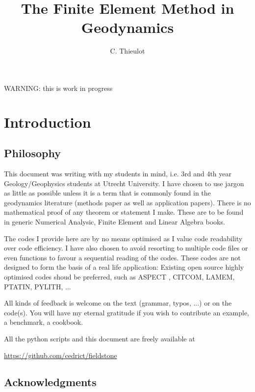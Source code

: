 \documentclass[a4paper]{article}
\title{The Finite Element Method in Geodynamics}
\author{C. Thieulot}
\begin{document}
\maketitle

\tableofcontents

\newpage

\begin{center}
{\color{red} \huge WARNING: this is work in progress}
\end{center}

\section{Introduction}

\subsection{Philosophy} %
This document was writing with my students in mind, i.e. 3rd and 4th year 
Geology/Geophysics students at Utrecht University. 
I have chosen to use jargon as little as possible unless it is a term that is 
commonly found in the geodynamics literature (methods paper as well as 
application papers). There is no mathematical proof of any theorem or statement 
I make. These are to be found in generic Numerical Analysic, Finite Element and 
Linear Algebra books. 

The codes I provide here are by no means optimised as I value code readability 
over code efficiency. I have also chosen to avoid resorting to multiple code 
files or even functions to favour a sequential reading of the codes. 
These codes are not designed to form the basis of a real life application:
Existing open source highly optimised codes shoud be preferred, such as 
ASPECT \cite{krhb12,hedg17}, 
CITCOM, LAMEM, PTATIN, PYLITH, ... 

All kinds of feedback is welcome on the text (grammar, typos, ...) or on the 
code(s). You will have my eternal gratitude if you wish to contribute an 
example, a benchmark, a cookbook. 

All the python scripts and this document are freely available at 
\begin{center}
\url{https://github.com/cedrict/fieldstone}
\end{center}

\subsection{Acknowledgments} %
\end{document}
